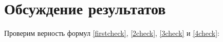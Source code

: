 \begin{figure}[!h]
   \begin{minipage}[h]{0.49\linewidth}
   \end{minipage}
   \hfill
   \begin{minipage}[h]{0.49\linewidth}
   \end{minipage}
\end{figure}
\newpage
\section{Обсуждение результатов} 
Проверим верность формул \eqref{firstcheck}, \eqref{2check}, \eqref{3check} и \eqref{4check}:

